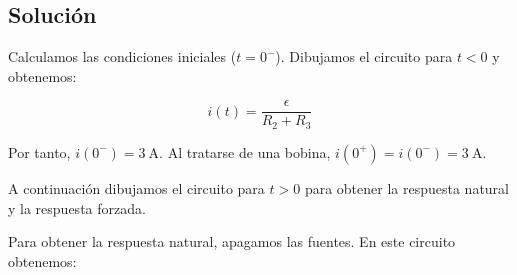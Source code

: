 \subsection*{Solución}

Calculamos las condiciones iniciales ($t = 0^-$). Dibujamos el circuito para $t < 0$ y obtenemos:

\vspace{4mm}
\begin{minipage}{0.5\textwidth}
\end{minipage}
\begin{minipage}{0.2\textwidth}
  \begin{equation*}
    i(t) = \frac{\epsilon}{R_2 + R_3}
  \end{equation*}
\end{minipage}

\vspace{4mm}
Por tanto, $i(0^-) = \SI{3}{\ampere}$. Al tratarse de una bobina,
$i(0^+) = i(0^-) = \SI{3}{\ampere}$.

\vspace{2mm}
A continuación dibujamos el circuito para $t > 0$ para obtener la
respuesta natural y la respuesta forzada.

\vspace{2mm}
Para obtener la respuesta natural, apagamos las fuentes. En este
circuito obtenemos:

